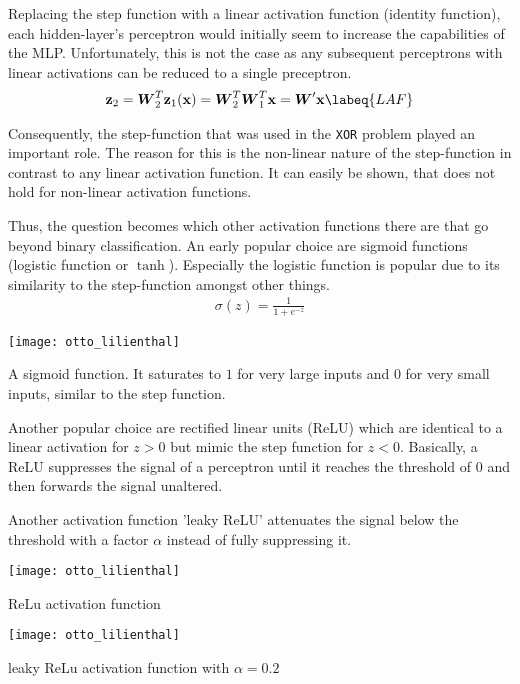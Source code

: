 Replacing the step function with a linear activation function (\ie identity function), each hidden-layer's perceptron would initially seem to increase the capabilities of the MLP.
Unfortunately, this is not the case as any subsequent perceptrons with linear activations can be reduced to a single preceptron.
\begin{align}
    \vec{z}_2 = \mat{W}^T_2 \vec{z}_1(\vec{x}) = \mat{W}^T_2 \mat{W}^T_1 \vec{x} = \mat{W}' \vec{x}
    \labeq{LAF}
\end{align}

Consequently, the step-function that was used in the \lstinline|XOR| problem played an important role.
The reason for this is the non-linear nature of the step-function in contrast to any linear activation function.
It can easily be shown, that  does not hold for non-linear activation functions.

Thus, the question becomes which other activation functions there are that go beyond binary classification.
An early popular choice are sigmoid functions (logistic function or $\tanh$).
Especially the logistic function is popular due to its similarity to the step-function amongst other things.
\begin{align}
    \sigma(z) = \frac{1}{1 + e^{-z}}
\end{align}
\begin{marginfigure}
    \texttt{[image: otto\_lilienthal]}
    \caption[]{A sigmoid function. It saturates to $1$ for very large inputs and $0$ for very small inputs, similar to the step function.}
\end{marginfigure}

Another popular choice are rectified linear units (ReLU) which are identical to a linear activation for $z > 0$ but mimic the step function for $z < 0$.
Basically, a ReLU suppresses the signal of a perceptron until it reaches the threshold of $0$ and then forwards the signal unaltered.

Another activation function 'leaky ReLU' attenuates the signal below the threshold with a factor $\alpha$ instead of fully suppressing it.
\begin{marginfigure}
    \texttt{[image: otto\_lilienthal]}
    \caption[]{ReLu activation function}
\end{marginfigure}
\begin{marginfigure}
    \texttt{[image: otto\_lilienthal]}
    \caption[]{leaky ReLu activation function with $\alpha = 0.2$}
\end{marginfigure}


